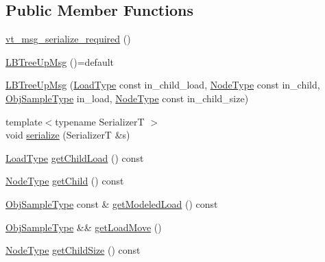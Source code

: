\subsection*{Public Member Functions}
\begin{DoxyCompactItemize}
\item 
\hyperlink{structvt_1_1vrt_1_1collection_1_1lb_1_1_l_b_tree_up_msg_af56129ab0f46796fb31785e0a573cb5d}{vt\+\_\+msg\+\_\+serialize\+\_\+required} ()
\item 
\hyperlink{structvt_1_1vrt_1_1collection_1_1lb_1_1_l_b_tree_up_msg_a3dd039d297e1ea09939a13ad5a3722a3}{L\+B\+Tree\+Up\+Msg} ()=default
\item 
\hyperlink{structvt_1_1vrt_1_1collection_1_1lb_1_1_l_b_tree_up_msg_ac2ff0f6b4a047ab11a0cd372c54a141e}{L\+B\+Tree\+Up\+Msg} (\hyperlink{structvt_1_1vrt_1_1collection_1_1lb_1_1_l_b_tree_up_msg_a94e88fdd5142e26330a7feb8769de1bb}{Load\+Type} const in\+\_\+child\+\_\+load, \hyperlink{namespacevt_a866da9d0efc19c0a1ce79e9e492f47e2}{Node\+Type} const in\+\_\+child, \hyperlink{structvt_1_1vrt_1_1collection_1_1lb_1_1_hier_l_b_types_a597a60d517207b90e8c7984eac434e8f}{Obj\+Sample\+Type} in\+\_\+load, \hyperlink{namespacevt_a866da9d0efc19c0a1ce79e9e492f47e2}{Node\+Type} const in\+\_\+child\+\_\+size)
\item 
{\footnotesize template$<$typename SerializerT $>$ }\\void \hyperlink{structvt_1_1vrt_1_1collection_1_1lb_1_1_l_b_tree_up_msg_a6d948678b6361cbaa753d878b72fbce8}{serialize} (SerializerT \&s)
\item 
\hyperlink{structvt_1_1vrt_1_1collection_1_1lb_1_1_l_b_tree_up_msg_a94e88fdd5142e26330a7feb8769de1bb}{Load\+Type} \hyperlink{structvt_1_1vrt_1_1collection_1_1lb_1_1_l_b_tree_up_msg_a24c0c47c9e76945c75b7827ccdb8b446}{get\+Child\+Load} () const
\item 
\hyperlink{namespacevt_a866da9d0efc19c0a1ce79e9e492f47e2}{Node\+Type} \hyperlink{structvt_1_1vrt_1_1collection_1_1lb_1_1_l_b_tree_up_msg_a430d99ecbeb875f33ecd1b4c33c6ea5f}{get\+Child} () const
\item 
\hyperlink{structvt_1_1vrt_1_1collection_1_1lb_1_1_hier_l_b_types_a597a60d517207b90e8c7984eac434e8f}{Obj\+Sample\+Type} const  \& \hyperlink{structvt_1_1vrt_1_1collection_1_1lb_1_1_l_b_tree_up_msg_a2ab64313485fc6b4b091c1a7a0b94aa1}{get\+Modeled\+Load} () const
\item 
\hyperlink{structvt_1_1vrt_1_1collection_1_1lb_1_1_hier_l_b_types_a597a60d517207b90e8c7984eac434e8f}{Obj\+Sample\+Type} \&\& \hyperlink{structvt_1_1vrt_1_1collection_1_1lb_1_1_l_b_tree_up_msg_aa5c9744fbb8557e3ec37846d9c8e09e7}{get\+Load\+Move} ()
\item 
\hyperlink{namespacevt_a866da9d0efc19c0a1ce79e9e492f47e2}{Node\+Type} \hyperlink{structvt_1_1vrt_1_1collection_1_1lb_1_1_l_b_tree_up_msg_a6d1dee8d6c40a169c16d1bbddb371478}{get\+Child\+Size} () const
\end{DoxyCompactItemize}
